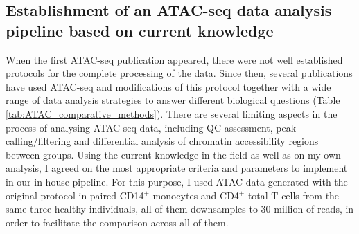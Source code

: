 \subsection{Establishment of an ATAC-seq data analysis pipeline based on current knowledge}
When the first ATAC-seq publication \parencite{Buenrostro2013} appeared, there were not well established protocols for the complete processing of the data. Since then, several publications have used ATAC-seq and modifications of this protocol together with a wide range of data analysis strategies to answer different biological questions (Table \ref{tab:ATAC_comparative_methods}).
There are several limiting aspects in the process of analysing ATAC-seq data, including QC assessment, peak calling/filtering and differential analysis of chromatin accessibility regions between groups. Using the current knowledge in the field as well as on my own analysis, I agreed on the most appropriate criteria and parameters to implement in our in-house pipeline. For this purpose, I used ATAC data generated with the original protocol \parencite{Buenrostro2013} in paired CD14$^+$ monocytes and CD4$^+$ total T cells from the same three healthy individuals, all of them downsamples to 30 million of reads, in order to facilitate the comparison across all of them.


